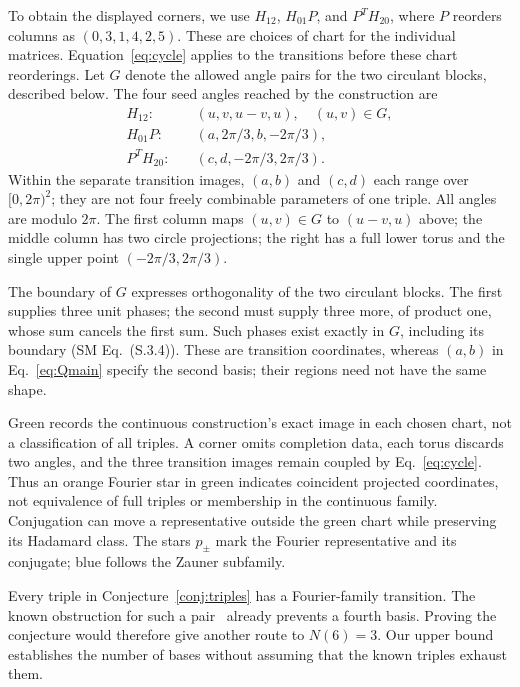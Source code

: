 To obtain the displayed corners, we use $H_{12}$, $H_{01}P$, and $P^TH_{20}$, where $P$ reorders columns as $(0,3,1,4,2,5)$. These are choices of chart for the individual matrices. Equation~\eqref{eq:cycle} applies to the transitions before these chart reorderings. Let $G$ denote the allowed angle pairs for the two circulant blocks, described below. The four seed angles reached by the construction are
\begin{equation}
 \begin{aligned}
 H_{12}:\quad &(u,v,u-v,u),\quad (u,v)\in G,\\
 H_{01}P:\quad &(a,2\pi/3,b,-2\pi/3),\\
 P^TH_{20}:\quad &(c,d,-2\pi/3,2\pi/3).
 \end{aligned}
 \label{eq:regions}
\end{equation}
Within the separate transition images, $(a,b)$ and $(c,d)$ each range over $[0,2\pi)^2$; they are not four freely combinable parameters of one triple. All angles are modulo $2\pi$. The first column maps $(u,v)\in G$ to $(u-v,u)$ above; the middle column has two circle projections; the right has a full lower torus and the single upper point $(-2\pi/3,2\pi/3)$.

The boundary of $G$ expresses orthogonality of the two circulant blocks. The first supplies three unit phases; the second must supply three more, of product one, whose sum cancels the first sum. Such phases exist exactly in $G$, including its boundary (SM Eq.~(S.3.4)). These are transition coordinates, whereas $(a,b)$ in Eq.~\eqref{eq:Qmain} specify the second basis; their regions need not have the same shape.

Green records the continuous construction's exact image in each chosen chart, not a classification of all triples. A corner omits completion data, each torus discards two angles, and the three transition images remain coupled by Eq.~\eqref{eq:cycle}. Thus an orange Fourier star in green indicates coincident projected coordinates, not equivalence of full triples or membership in the continuous family. Conjugation can move a representative outside the green chart while preserving its Hadamard class. The stars $p_\pm$ mark the Fourier representative and its conjugate; blue follows the Zauner subfamily.

Every triple in Conjecture~\ref{conj:triples} has a Fourier-family transition. The known obstruction for such a pair~\cite{Jaming2009} already prevents a fourth basis. Proving the conjecture would therefore give another route to $N(6)=3$. Our upper bound establishes the number of bases without assuming that the known triples exhaust them.

